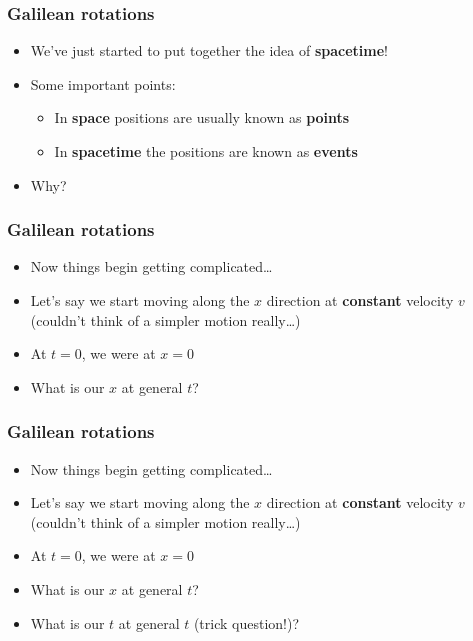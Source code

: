 \documentclass{beamer}
\begin{document}
\begin{frame}
  \frametitle{Galilean rotations}
  \begin{itemize}
    \item<1-> We've just started to put together the idea of \textbf{spacetime}!
    \item<2-> Some important points:
      \begin{itemize}
	\item In \textbf{space} positions are usually known as \textbf{points}
	\item In \textbf{spacetime} the positions are known as \textbf{events}
      \end{itemize}
    \item<3-> Why?
  \end{itemize}
\end{frame}

\begin{frame}
  \frametitle{Galilean rotations}
  \begin{itemize}
    \item<1-> Now things begin getting complicated\ldots
    \item<2-> Let's say we start moving along the $x$ direction at \textbf{constant} velocity $v$ (couldn't think of a simpler motion really\ldots)
    \item<3-> At $t=0$, we were at $x=0$
    \item<4-> What is our $x$ at general $t$?
  \end{itemize}
\end{frame}

\begin{frame}
  \frametitle{Galilean rotations}
  \begin{itemize}
    \item<1-> Now things begin getting complicated\ldots
    \item<2-> Let's say we start moving along the $x$ direction at \textbf{constant} velocity $v$ (couldn't think of a simpler motion really\ldots)
    \item<3-> At $t=0$, we were at $x=0$
    \item<4-> What is our $x$ at general $t$?
    \item<4-> What is our $t$ at general $t$ (trick question!)?
  \end{itemize}
\end{frame}
\end{document}
